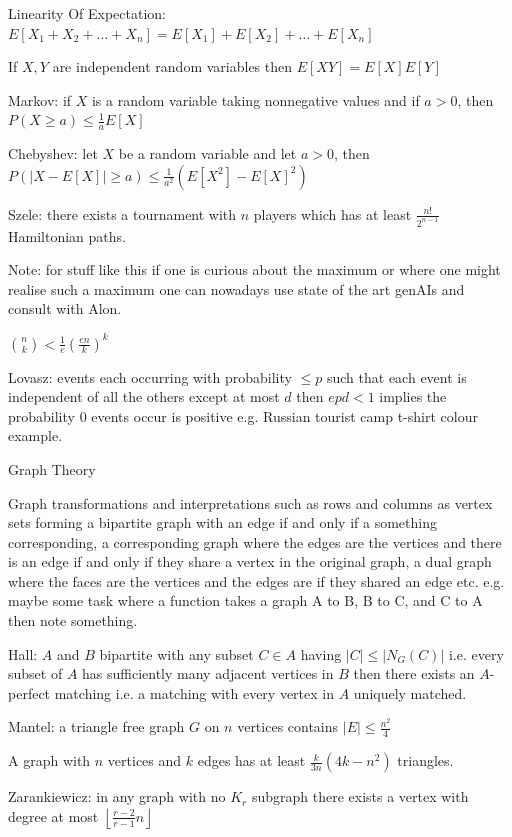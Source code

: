 Linearity Of Expectation: $E[X_1 + X_2 + \dots + X_n] = E[X_1] + E[X_2] + \dots + E[X_n]$

If $X,Y$ are independent random variables then $E[XY] = E[X]E[Y]$

Markov: if $X$ is a random variable taking nonnegative values and if $a>0$, then $P(X \ge a) \le \frac{1}{a} E[X]$

Chebyshev: let $X$ be a random variable and let $a>0$, then $P(|X-E[X]| \ge a) \le \frac{1}{a^2}(E[X^2]-E[X]^2)$

Szele: there exists a tournament with $n$ players which has at least $\frac{n!}{2^{n-1}}$ Hamiltonian paths.

Note: for stuff like this if one is curious about the maximum or where one might realise such a maximum one can nowadays use state of the art genAIs and consult with Alon.

$\binom{n}{k} < \frac{1}{e} \left( \frac{en}{k} \right)^k$

Lovasz: events each occurring with probability $\le p$ such that each event is independent of all the others except at most $d$ then $epd < 1$ implies the probability $0$ events occur is positive e.g. Russian tourist camp t-shirt colour example.

Graph Theory

Graph transformations and interpretations such as rows and columns as vertex sets forming a bipartite graph with an edge if and only if a something corresponding, a corresponding graph where the edges are the vertices and there is an edge if and only if they share a vertex in the original graph, a dual graph where the faces are the vertices and the edges are if they shared an edge etc. e.g. maybe some task where a function takes a graph A to B, B to C, and C to A then note something.

Hall: $A$ and $B$ bipartite with any subset $C \in A$ having $|C| \le |N_G (C)|$ i.e. every subset of $A$ has sufficiently many adjacent vertices in $B$ then there exists an $A$-perfect matching i.e. a matching with every vertex in $A$ uniquely matched.

Mantel: a triangle free graph $G$ on $n$ vertices contains $|E| \le \frac{n^2}{4}$

A graph with $n$ vertices and $k$ edges has at least $\frac{k}{3n}(4k-n^2)$ triangles.

Zarankiewicz: in any graph with no $K_r$ subgraph there exists a vertex with degree at most $\left\lfloor \frac{r-2}{r-1}n \right\rfloor$

